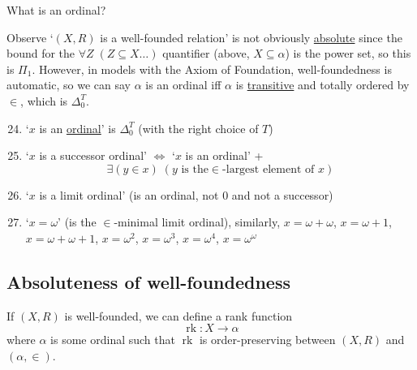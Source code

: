\documentclass{article}
\newcommand{\named}[1]{\textbf{#1}\index{#1}}
\newcommand{\1}{\mathbbm{1}}
\DeclareMathOperator{\rk}{rk}
\begin{document}
What is an ordinal?

Observe `$(X,R)$ is a well-founded relation' is not obviously \hyperlink{def:abso}{absolute} since the bound for the $\forall Z\; (Z \subseteq X \dots)$ quantifier (above, $X \subseteq \alpha$) is the power set, so this is \hyperlink{def:pi1}{$\Pi_1$}.
However, in models with the Axiom of Foundation, well-foundedness is automatic, so we can say $\alpha$ is an ordinal iff $\alpha$ is \hyperlink{def:transitive}{transitive} and totally ordered by $\in$, which is \hyperlink{def:delta0t}{$\Delta_0^T$}.

\begin{enumerate}
  \setcounter{enumi}{23}
  \item \newlec`$x$ is an \hyperlink{def:ordinal}{ordinal}' is \hyperlink{def:delta0t}{$\Delta_0^T$} (with the right choice of $T$)
  \item `$x$ is a successor ordinal' $\iff$ `$x$ is an ordinal' +
      \begin{equation*}\exists (y \in x) \; (y\text{ is the}\in\text{-largest element of }x )\end{equation*}
    \item `$x$ is a limit ordinal' (is an ordinal, not $0$ and not a successor)
    \item `$x = \omega$' (is the $\in$-minimal limit ordinal), similarly, $x = \omega + \omega$, $x = \omega + 1$, $x = \omega + \omega + 1$, $x = \omega^2$, $x = \omega^3$, $x = \omega^4$, $x = \omega^\omega$
\end{enumerate}

\subsection{Absoluteness of well-foundedness}
If $(X,R)$ is well-founded, we can define a rank function
\begin{equation*}
  \rk: X \to \alpha
\end{equation*}
where $\alpha$ is some ordinal such that $\rk$ is order-preserving between $(X,R)$ and $(\alpha,\in)$.
\end{document}
